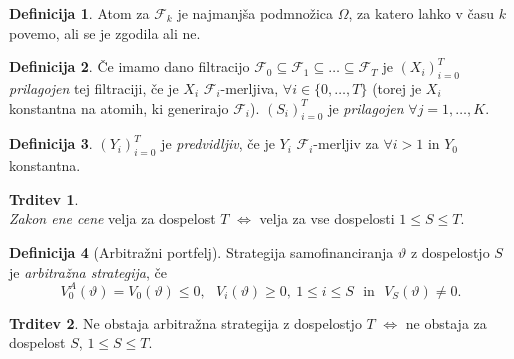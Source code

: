 \documentclass[11pt]{article}
\newcommand{\F}{\mathcal{F}}
\newcommand{\1}{\mathbbm{1}}
\theoremstyle{definition}
\newtheorem{definicija}{Definicija}[section]
\theoremstyle{definition}
\newtheorem{trditev}{Trditev}[section]
\begin{document}
\begin{definicija}

Atom za $\F_k$ je najmanjša podmnožica $\Omega$, za katero lahko v času $k$ povemo, ali se je zgodila ali ne.

\end{definicija}
\vspace{0.5cm}

\begin{definicija}

Če imamo dano filtracijo $\F_0 \subseteq \F_1 \subseteq \ldots \subseteq \F_T$ je $(X_i)_{i=0}^T$ \textit{prilagojen} tej filtraciji, če je $X_i$ $\F_i$-merljiva, $\forall i \in \{0,\ldots, T\}$ (torej je $X_i$ konstantna na atomih, ki generirajo $\F_i$). $(S_i)_{i=0}^T$ je \textit{prilagojen} $\forall j = 1,\ldots, K$.

\end{definicija}
\vspace{0.5cm}

\begin{definicija}

$(Y_i)_{i=0}^T$ je \textit{predvidljiv}, če je $Y_i$ $\F_i$-merljiv za $\forall i > 1$ in $Y_0$ konstantna.

\end{definicija}
\vspace{0.5cm}

\begin{trditev}
~\\
\textit{Zakon ene cene} velja za dospelost $T$ $\iff$ velja za vse dospelosti $1 \leq S \leq T$.

\end{trditev}
\vspace{0.5cm}

\begin{definicija}[Arbitražni portfelj]

Strategija samofinanciranja $\vartheta$ z dospelostjo $S$ je \textit{arbitražna strategija}, če 
$$V_0^A(\vartheta) = V_0(\vartheta) \leq 0, ~~~V_i(\vartheta) \geq 0, ~1 \leq i \leq S ~~~\text{in}~~~ V_S(\vartheta) \neq 0.$$

\end{definicija}
\vspace{0.5cm}

\begin{trditev}

Ne obstaja arbitražna strategija z dospelostjo $T$ $\iff$ ne obstaja za dospelost $S$, $1 \leq S \leq T$.

\end{trditev}
\vspace{0.5cm}
\end{document}
